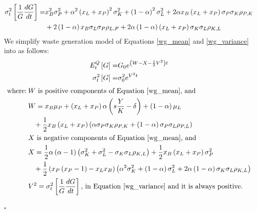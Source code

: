 \documentclass[sn-basic]{sn-jnl}%
\theoremstyle{thmstyleone}%
\theoremstyle{thmstyletwo}%
\theoremstyle{thmstylethree}%
\begin{document}
\begin{appendices}
	\begin{align}\label{wg_variance}
		\sigma_t^2\left[\frac{1}{G}\frac{dG}{dt}\right]=&x_B^2\sigma_P^2+\alpha^2\left(x_L+x_P\right)^2\sigma_K^2+\left(1-\alpha\right)^2\sigma_L^2+2\alpha x_B\left(x_L+x_P\right)\sigma_P\sigma_K\rho_{P,K}\notag\\
		&+2\left(1-\alpha\right)x_B\sigma_L\sigma_P\rho_{L,P}+2\alpha\left(1-\alpha\right)\left(x_L+x_P\right)\sigma_K\sigma_L\rho_{K,L}
	\end{align}
	We simplify waste generation model of Equations \ref{wg_mean} and \ref{wg_variance} into as follows:
	\begin{align} \label{simple_gen_waste}
		E_t^Q\left[G\right]=&G_0e^{\left(W-X-\frac{1}{2}V^2\right)t}\notag\\
		\sigma_t^2\left[G\right]=&\sigma_0^2e^{V^2t}
	\end{align}
	\begin{align}
		\text{where:}\:& W \text{ is positive components of Equation \ref{wg_mean}, and}\notag\\
		& W=x_B\mu_P +\left(x_L+x_P\right)\alpha\left(s\frac{Y}{K}-\delta\right)+\left(1-\alpha\right)\mu_L\notag\\
		&\;\;\;+ \frac{1}{2}x_B\left(x_L+x_P\right)\left(\alpha\sigma_P\sigma_K\rho_{P,K}+\left(1-\alpha\right)\sigma_P\sigma_L\rho_{P,L}\right)\notag\\
		& X \text{ is negative components of Equation \ref{wg_mean}, and}\notag\\
		& X=\frac{1}{2}\alpha\left(\alpha-1\right)\left(\sigma_K^2+\sigma_L^2-\sigma_K\sigma_L\rho_{K,L}\right)+\frac{1}{2}x_B\left(x_L+x_P\right)\sigma_P^2 \notag\\
		&\;\;\;+\frac{1}{2}\left(x_P\left(x_P-1\right)-x_Lx_B\right)\left( \alpha^2\sigma_K^2+\left(1-\alpha\right)\sigma_L^2+2\alpha\left(1-\alpha\right)\sigma_K\sigma_L\rho_{K,L} \right)\notag\\
		& V^2=\sigma_t^2\left[\frac{1}{G}\frac{dG}{dt}\right]\text{, in Equation \ref{wg_variance} and it is always positive.}\notag
	\end{align}
\begin{flushright}
$\square$
\end{flushright}



\end{appendices}
\end{document}
